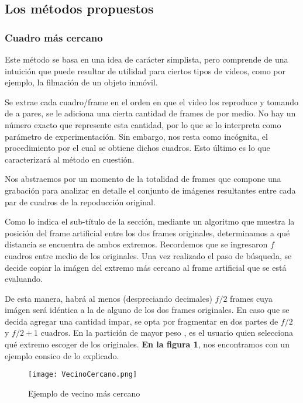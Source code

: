 \subsection{Los m\'etodos propuestos}

\subsubsection{Cuadro m\'as cercano}

Este m\'etodo se basa en una idea de car\'acter simplista, pero comprende de una intuici\'on que puede resultar de utilidad para ciertos tipos de videos, como por ejemplo, la filmaci\'on de un objeto inm\'ovil.

Se extrae cada cuadro/frame en el orden en que el video los reproduce y tomando de a pares, se le adiciona una cierta cantidad de frames de por medio. No hay un n\'umero exacto que represente esta cantidad, por lo que se lo interpreta como par\'ametro de experimentaci\'on. Sin embargo, nos resta como inc\'ognita, el procedimiento por el cual se obtiene dichos cuadros. Esto \'ultimo es lo que caracterizar\'a al m\'etodo en cuesti\'on.

Nos abstraemos por un momento de la totalidad de frames que compone una grabaci\'on para analizar en detalle el conjunto de im\'agenes resultantes entre cada par de cuadros de la repoducci\'on original.

Como lo indica el sub-t\'itulo de la secci\'on, mediante un algoritmo que muestra la posici\'on del frame artificial entre los dos frames originales, determinamos a qu\'e distancia se encuentra de ambos extremos. Recordemos que se ingresaron $f$ cuadros entre medio de los originales. Una vez realizado el paso de b\'usqueda, se decide copiar la im\'agen del extremo m\'as cercano al frame artificial que se est\'a evaluando. 

De esta manera, habr\'a al menos (despreciando decimales) $f/2$  frames cuya im\'agen ser\'a id\'entica a la de alguno de los dos frames originales. En caso que se decida agregar una cantidad impar, se opta por fragmentar en dos partes de $f/2$ y $f/2+1$ cuadros. En la partici\'on de mayor peso
, es el usuario quien selecciona qu\'e extremo escoger de los originales. \textbf{En la figura 1}, nos encontramos con un ejemplo consico de lo explicado.

\begin{figure}[h!]
  \centering
    \texttt{[image: VecinoCercano.png]}
     \caption{Ejemplo de vecino m\'as cercano}
\end{figure}
\noindent

